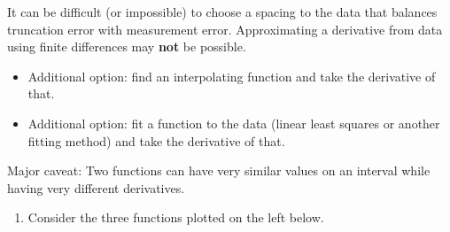 \documentclass[12pt,letterpaper,noanswers]{exam}
\begin{document}
\begin{tcolorbox}

It can be difficult (or impossible) to choose a spacing to the data that balances truncation error with measurement error.  Approximating a derivative from data using finite differences may \textbf{not} be possible.

\begin{itemize}
\itemsep0pt
    \item Additional option: find an interpolating function and take the derivative of that.
    \item Additional option: fit a function to the data (linear least squares or another fitting method) and take the derivative of that.
\end{itemize}

Major caveat: Two functions can have very similar values on an interval while having very different derivatives.  
\end{tcolorbox}
\begin{enumerate}[resume=classQ]
\item Consider the three functions plotted on the left below.  



\end{enumerate}
\end{document}
